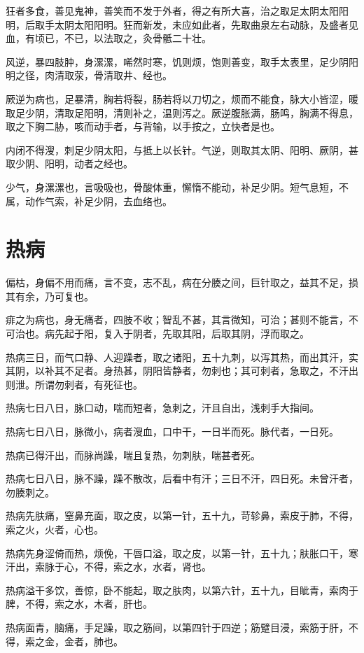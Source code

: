 \documentclass[a4paper,12pt,UTF8,twoside]{ctexbook}
\begin{document}
	狂者多食，善见鬼神，善笑而不发于外者，得之有所大喜，治之取足太阴太阳阳明，后取手太阴太阳阳明。狂而新发，未应如此者，先取曲泉左右动脉，及盛者见血，有顷已，不已，以法取之，灸骨骶二十壮。
	
	风逆，暴四肢肿，身漯漯，唏然时寒，饥则烦，饱则善变，取手太表里，足少阴阳明之径，肉清取荥，骨清取井、经也。
	
	厥逆为病也，足暴清，胸若将裂，肠若将以刀切之，烦而不能食，脉大小皆涩，暖取足少阴，清取足阳明，清则补之，温则泻之。厥逆腹胀满，肠鸣，胸满不得息，取之下胸二胁，咳而动手者，与背输，以手按之，立快者是也。
	
	内闭不得溲，刺足少阴太阳，与抵上以长针。气逆，则取其太阴、阳明、厥阴，甚取少阴、阳明，动者之经也。
	
	少气，身漯漯也，言吸吸也，骨酸体重，懈惰不能动，补足少阴。短气息短，不属，动作气索，补足少阴，去血络也。
	\chapter{热病}
	
	偏枯，身偏不用而痛，言不变，志不乱，病在分腠之间，巨针取之，益其不足，损其有余，乃可复也。
	
	痱之为病也，身无痛者，四肢不收；智乱不甚，其言微知，可治；甚则不能言，不可治也。病先起于阳，复入于阴者，先取其阳，后取其阴，浮而取之。
	
	热病三日，而气口静、人迎躁者，取之诸阳，五十九刺，以泻其热，而出其汗，实其阴，以补其不足者。身热甚，阴阳皆静者，勿刺也；其可刺者，急取之，不汗出则泄。所谓勿刺者，有死征也。
	
	热病七日八日，脉口动，喘而短者，急刺之，汗且自出，浅刺手大指间。
	
	热病七日八日，脉微小，病者溲血，口中干，一日半而死。脉代者，一日死。
	
	热病已得汗出，而脉尚躁，喘且复热，勿刺肤，喘甚者死。
	
	热病七日八日，脉不躁，躁不散改，后看中有汗；三日不汗，四日死。未曾汗者，勿腠刺之。
	
	热病先肤痛，窒鼻充面，取之皮，以第一针，五十九，苛轸鼻，索皮于肺，不得，索之火，火者，心也。
	
	热病先身涩倚而热，烦俛，干唇口溢，取之皮，以第一针，五十九；肤胀口干，寒汗出，索脉于心，不得，索之水，水者，肾也。
	
	热病溢干多饮，善惊，卧不能起，取之肤肉，以第六针，五十九，目眦青，索肉于脾，不得，索之水，木者，肝也。
	
	热病面青，脑痛，手足躁，取之筋间，以第四针于四逆；筋躄目浸，索筋于肝，不得，索之金，金者，肺也。
	
\end{document}
